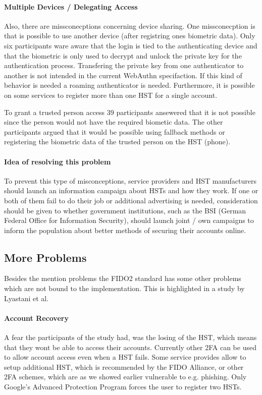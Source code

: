 \documentclass[runningheads]{llncs}
\begin{document}
\paragraph{Multiple Devices / Delegating Access}
Also, there are missconecptions concerning device sharing. One missconecption is that is possible to use another device (after registring ones biometric data). Only six participants ware aware that the login is tied to the authenticating device and that the biometric is only used to decrypt and unlock the private key for the authentication process. Transfering the private key from one authenticator to another is not intended in the current WebAuthn specifaction. If this kind of behavior is needed a roaming authenticator is needed. Furthermore, it is possible on some services to register more than one HST for a single account.

To grant a trusted person access 39 participants ansewered that it is not possible since the person would not have the required biometic data. The other participants argued that it would be possible using fallback methods or registering the biometric data of the trusted person on the HST (phone).

\paragraph{Idea of resolving this problem}
To prevent this type of misconceptions, service providers and HST manufacturers should launch an information campaign about HSTs and how they work. 
If one or both of them fail to do their job or additional advertising is needed, consideration should be given to whether government institutions, such as the BSI (German Federal Office for Information Security), should launch joint / own campaigns to inform the population about better methods of securing their accounts online.

\subsection{More Problems}
Besides the mention problems the FIDO2 standard has some other problems which are not bound to the implementation. This is highlighted in a study by Lyastani et al. \cite{9152694}

\paragraph{Account Recovery}
A fear the participants of the study had, was the losing of the HST, which means that they wont be able to access their accounts. Currently other 2FA can be used to allow account access even when a HST fails. Some service provides allow to setup additional HST, which is recommended by the FIDO Alliance, or other 2FA schemes, which are as we showed earlier vulnerable to e.g. phishing. Only Google's Advanced Protection Program forces the user to register two HSTs.
\end{document}
